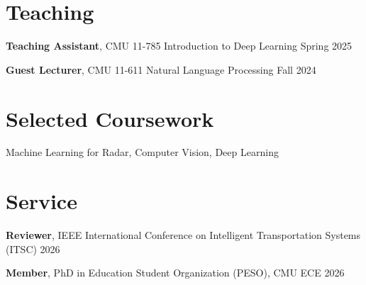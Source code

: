 \documentclass[10pt,letterpaper]{article}
\begin{document}
\section{Teaching}
\textbf{Teaching Assistant}, CMU 11-785 Introduction to Deep Learning \hfill Spring 2025\par\vspace{0.3em}
\textbf{Guest Lecturer}, CMU 11-611 Natural Language Processing \hfill Fall 2024\par

\section{Selected Coursework}
Machine Learning for Radar, Computer Vision, Deep Learning

\section{Service}
\textbf{Reviewer}, IEEE International Conference on Intelligent Transportation Systems (ITSC) \hfill 2026\par\vspace{0.3em}
\textbf{Member}, PhD in Education Student Organization (PESO), CMU ECE \hfill 2026\par

\end{document}
